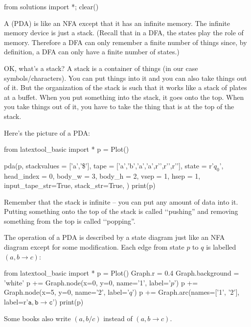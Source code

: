 \begin{python0}
from solutions import *; clear()
\end{python0}

A  (PDA) is like an NFA except that it has
an infinite memory. The infinite memory device is just a stack.
(Recall that in a DFA, the states play the role of memory.
Therefore a DFA can only remember a finite number of things since, by definition, a DFA
can only have a finite number of states.)

OK, what's a stack?
A stack is a container of things (in our case symbols/characters).
You can put things into it and you can also take things out of it.
But the organization of the stack is such that it works like a stack
of plates at a buffet.
When you put something into the stack, it goes onto the top.
When you take things out of it, you have to take the thing that is
at the top of the stack.

Here's the picture of a PDA:

\begin{python}
from latextool_basic import *
p = Plot()

pda(p,
    stackvalues = ['a','\$'],
    tape = ['a','b','a','a',r'\SPACE',r'\SPACE',r'\SPACE'],
    state = r'$q_0$',
    head_index = 0,
    body_w = 3,
    body_h = 2,
    vsep = 1,
    hsep = 1,
    input_tape_str=True,
    stack_str=True,
    )
print(p)
\end{python}

Remember that the stack is infinite -- you can put any amount of data into it.
Putting something onto the top of the stack is called \lq\lq pushing''
and removing something from the top is called \lq\lq popping''.

The operation of a PDA is described by a state diagram just like
an NFA diagram except for some modification.
Each edge from state $p$ to $q$ is labelled
$(a, b \rightarrow c)$:

\begin{python}
from latextool_basic import *
p = Plot()
Graph.r = 0.4
Graph.background = 'white'
p += Graph.node(x=0, y=0, name='1', label='$p$')
p += Graph.node(x=5, y=0, name='2', label='$q$')
p += Graph.arc(names=['1', '2'], label=r'$\texttt{a}, \texttt{b} \rightarrow \texttt{c} $')
print(p)
\end{python}


Some books also write
$(a,b/c)$
instead of
$(a, b \rightarrow c)$.

